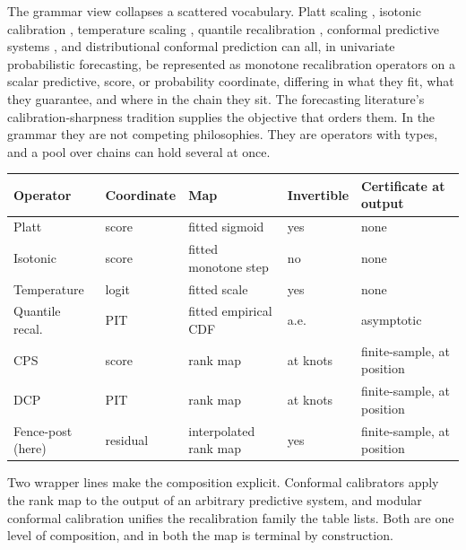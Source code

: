 \documentclass[11pt]{article}
\theoremstyle{remark}
\begin{document}
The grammar view collapses a scattered vocabulary. Platt scaling
\citep{platt1999probabilistic}, isotonic calibration \citep{zadrozny2002transforming},
temperature scaling \citep{guo2017calibration}, quantile recalibration
\citep{kuleshov2018accurate}, conformal predictive systems \citep{vovk2019nonparametric},
and distributional conformal prediction \citep{chernozhukov2021distributional} can all,
in univariate probabilistic forecasting, be represented as monotone recalibration
operators on a scalar predictive, score, or probability coordinate, differing in what
they fit, what they guarantee, and where in the chain they sit. The forecasting literature's
calibration-sharpness tradition \citep{gneiting2007probabilistic,gneiting2007strictly}
supplies the objective that orders them. In the grammar they are not competing philosophies.
They are operators with types, and a pool over chains can hold several at once.

\begin{center}
\footnotesize
\begin{tabular}{lllll}
\toprule
Operator & Coordinate & Map & Invertible & Certificate at output \\
\midrule
Platt & score & fitted sigmoid & yes & none \\
Isotonic & score & fitted monotone step & no & none \\
Temperature & logit & fitted scale & yes & none \\
Quantile recal.\ & PIT & fitted empirical CDF & a.e. & asymptotic \\
CPS & score & rank map & at knots & finite-sample, at position \\
DCP & PIT & rank map & at knots & finite-sample, at position \\
Fence-post (here) & residual & interpolated rank map & yes & finite-sample, at position \\
\bottomrule
\end{tabular}
\end{center}

Two wrapper lines make the composition explicit. Conformal calibrators
\citep{vovk2020calibrators} apply the rank map to the output of an arbitrary
predictive system, and modular conformal calibration \citep{marx2022modular} unifies
the recalibration family the table lists. Both are one level of composition, and in
both the map is terminal by construction.
\end{document}

